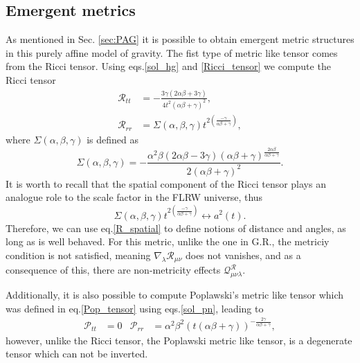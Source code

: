 \documentclass{article}
\begin{document}
\subsection{Emergent metrics}

As mentioned in Sec. \ref{sec:PAG} it is possible to obtain emergent metric structures 
in this purely affine model of gravity. The fist type of metric like tensor comes from the Ricci
tensor. Using eqs.\eqref{sol_hg} and \eqref{Ricci_tensor} we compute the Ricci tensor
\begin{align}
    \mathcal{R}_{tt} & = -\frac{3\gamma\left(2\alpha\beta + 3\gamma\right)}{4t^2\left(\alpha\beta + \gamma\right)^2}, \label{R_temporal} \\
    \mathcal{R}_{rr} & = \Sigma\left(\alpha,\beta,\gamma\right)t^{2\left(\frac{-\gamma}{\alpha\beta + \gamma}\right)} \label{R_spatial},
\end{align}
where $\Sigma\left(\alpha,\beta,\gamma\right)$ is defined as
\begin{equation}
    \Sigma\left(\alpha,\beta,\gamma\right) = -\frac{\alpha^2\beta\left(2\alpha\beta - 3\gamma\right)\left(\alpha\beta + \gamma\right)^{\frac{2\alpha\beta}{\alpha\beta + \gamma}}}{2\left(\alpha\beta +\gamma\right)^2}.
\end{equation}
It is worth to recall that the spatial component of the Ricci tensor plays an analogue role 
to the scale factor in the FLRW universe, thus
\begin{equation}
    \Sigma\left(\alpha,\beta,\gamma\right)t^{2\left(\frac{-\gamma}{\alpha\beta + \gamma}\right)} \longleftrightarrow a^2(t).
\end{equation}
Therefore, we can use eq.\eqref{R_spatial} to define notions of distance and angles, as long as is well behaved. For this metric,
unlike the one in G.R., the metriciy condition is not satisfied, meaning $\nabla_\lambda \mathcal{R}_{\mu\nu}$ does not vanishes, and 
as a consequence of this, there are non-metricity effects $\mathcal{Q}^{\mathcal{R}}_{\mu\nu\lambda}$.

Additionally, it is also possible to compute Poplawski's metric like tensor which was defined in eq.\eqref{Pop_tensor} using eqs.\eqref{sol_pn}, 
leading to
\begin{align}
    \mathcal{P}_{tt} & = 0 & \mathcal{P}_{rr} & = \alpha^2\beta^2\left(t\left(\alpha\beta + \gamma\right)\right)^{-\frac{2\gamma}{\alpha\beta + \gamma}},
\end{align}
however, unlike the Ricci tensor, the Poplawski metric like tensor, is a degenerate tensor which can not be inverted.
\end{document}
